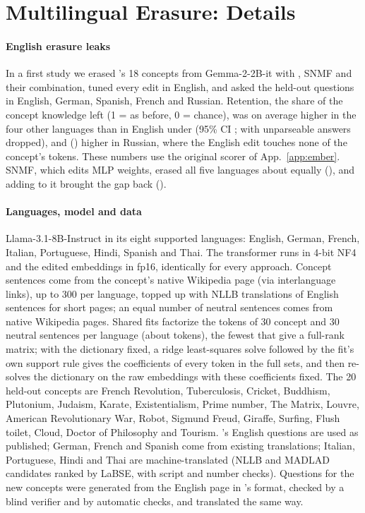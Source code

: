 \section{Multilingual Erasure: Details}
\label{app:ml}

\paragraph{English erasure leaks}
In a first study we erased \ember{}'s 18 concepts from Gemma-2-2B-it with \ember{}, SNMF \citep{shafran2026constructing} and their combination, tuned every edit in English, and asked the held-out questions in English, German, Spanish, French and Russian.
Retention, the share of the concept knowledge left (1 = as before, 0 = chance), was on average  higher in the four other languages than in English under \ember{} (95\% CI \expnum{[0.15, 0.32]};  with unparseable answers dropped), and  () higher in Russian, where the English edit touches none of the concept's tokens. These numbers use the original scorer of App.~\ref{app:ember}.
SNMF, which edits MLP weights, erased all five languages about equally (), and adding \ember{} to it brought the gap back ().

\paragraph{Languages, model and data}
Llama-3.1-8B-Instruct in its eight supported languages: English, German, French, Italian, Portuguese, Hindi, Spanish and Thai.
The transformer runs in 4-bit NF4 and the edited embeddings in fp16, identically for every approach.
Concept sentences come from the concept's native Wikipedia page (via interlanguage links), up to 300 per language, topped up with NLLB translations of English sentences for short pages; an equal number of neutral sentences comes from native Wikipedia pages.
Shared fits factorize the tokens of 30 concept and 30 neutral sentences per language (about  tokens), the fewest that give a full-rank matrix; with the dictionary fixed, a ridge least-squares solve followed by the fit's own support rule gives the coefficients of every token in the full sets, and \cinderz{} then re-solves the dictionary on the raw embeddings with these coefficients fixed.
The 20 held-out concepts are French Revolution, Tuberculosis, Cricket, Buddhism, Plutonium, Judaism, Karate, Existentialism, Prime number, The Matrix, Louvre, American Revolutionary War, Robot, Sigmund Freud, Giraffe, Surfing, Flush toilet, Cloud, Doctor of Philosophy and Tourism.
\ember{}'s English questions are used as published; German, French and Spanish come from existing translations; Italian, Portuguese, Hindi and Thai are machine-translated (NLLB and MADLAD candidates ranked by LaBSE, with script and number checks).
Questions for the new concepts were generated from the English page in \ember{}'s format, checked by a blind verifier and by automatic checks, and translated the same way.

